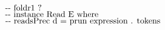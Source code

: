 \documentclass{article}
\begin{document}
\begin{tabbing}
${}$\\
${}$\\
${}$\\
${}$\\
${}$\\
${}$\\
${}$\\
${}$\\
${}$\\
${}$\\
${}$\\
${}$\\
${}$\\
${}$\\
${}$\\
${}$\\
${}$\\
${}$\\
${}$\\
${}$\\
${}$\\
${}$\\
${\mbox{\qquad-{}-  foldr1 ? }}$\\
${}$\\
${}$\\
${}$\\
${\mbox{\qquad-{}-  instance Read E where}}$\\
${\mbox{\qquad-{}-   readsPrec d = prun expression . tokens}}$
\end{tabbing}
\end{document}
